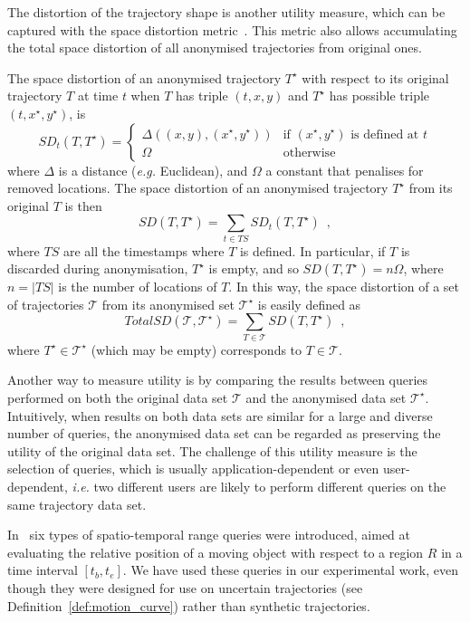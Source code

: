 The distortion of the trajectory shape is another utility measure,
which can be captured with the
space distortion metric~\cite[Sec.VI.B]{abul08}. This metric
also allows accumulating the total space distortion of all anonymised
trajectories from original ones.

\begin{definition}\label{def:distortion}
The space dis\-tort\-ion of an a\-no\-nym\-ised trajectory
$T^\star$ with respect to its original trajectory $T$ at
time $t$ when $T$ has triple $(t,x,y)$ and $T^\star$ has
possible triple $(t,x^\star,y^\star)$, is
$$SD_t(T,T^\star) = \begin{cases} \Delta((x,y),(x^\star,y^\star)) &
\text{if } (x^\star,y^\star) \text{ is defined at } t \\ \Omega & \text{otherwise}
\end{cases}$$
where $\Delta$ is a distance ({\em e.g.} Euclidean), and $\Omega$ a constant that
penalises for removed locations.
The space distortion of an anonymised trajectory
$T^\star$ from its original $T$ is then
$$SD(T,T^\star) = \sum_{t \in TS} SD_t(T,T^\star) \enspace ,$$
where $TS$ are all the timestamps where $T$ is defined. In particular, if
$T$ is discarded during anonymisation, $T^\star$ is empty, and so
$SD(T,T^\star) = n\Omega$, where $n = |TS|$ is the number of locations of $T$.
In this way, the space distortion of a set of trajectories $\mathcal{T}$
from its anonymised set $\mathcal{T}^\star$ is easily defined as
$$TotalSD(\mathcal{T}, \mathcal{T}^\star) = \sum_{T \in \mathcal{T}}
SD(T,T^\star) \enspace ,$$
where $T^\star \in \mathcal{T}^\star$ (which may be empty) corresponds to $T
\in \mathcal{T}$.
\end{definition}





Another way to measure utility is by comparing the results between queries
performed on both the original data set $\mathcal{T}$ and the
anonymised data set $\mathcal{T}^\star$. Intuitively, when results
on both data sets are similar for a large and diverse number of queries,
the anonymised data set can be regarded as preserving
the utility of the original data set. The challenge of this utility
measure is the selection of queries, which is usually
application-dependent or even user-dependent, {\em i.e.}
two different users are likely
to perform different queries on the same trajectory data set.

In~\cite{Trajcevski:2004:MUM:1016028.1016030} six types of spatio-temporal
range queries were introduced, aimed at evaluating the relative position
of a moving object with respect to a region $R$ in a time
interval $[t_b, t_e]$. We have used these queries
in our experimental work, even though they were designed
for use on uncertain trajectories
(see Definition~\ref{def:motion_curve})
rather than synthetic trajectories.

